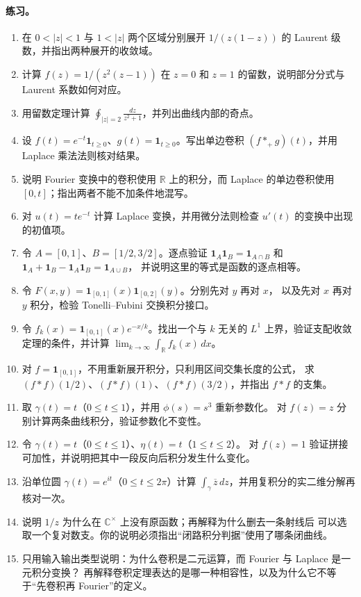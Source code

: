 \documentclass[UTF8,fontset=none,a4paper,11pt]{ctexart}
\theoremstyle{foundation-definition}
\theoremstyle{foundation-theorem}
\theoremstyle{foundation-proposition}
\theoremstyle{foundation-example}
\theoremstyle{foundation-remark}
\theoremstyle{foundation-theorem}
\begin{document}
\paragraph{练习。}
\begin{enumerate}[label=M3C.\arabic*.]
  \item 在 \(0<|z|<1\) 与 \(1<|z|\) 两个区域分别展开
    \(1/(z(1-z))\) 的 Laurent 级数，并指出两种展开的收敛域。
  \item 计算 \(f(z)=1/(z^2(z-1))\) 在 \(z=0\) 和 \(z=1\) 的留数，说明部分分式与 Laurent 系数如何对应。
  \item 用留数定理计算
    \(\displaystyle\oint_{|z|=2}\frac{dz}{z^2+1}\)，并列出曲线内部的奇点。
  \item 设 \(f(t)=e^{-t}\mathbf 1_{t\geq0}\)、\(g(t)=\mathbf 1_{t\geq0}\)。写出单边卷积
    \((f*_+g)(t)\)，并用 Laplace 乘法法则核对结果。
  \item 说明 Fourier 变换中的卷积使用 \(\mathbb R\) 上的积分，而 Laplace 的单边卷积使用 \([0,t]\)；指出两者不能不加条件地混写。
  \item 对 \(u(t)=t e^{-t}\) 计算 Laplace 变换，并用微分法则检查 \(u'(t)\) 的变换中出现的初值项。
  \item 令 \(A=[0,1]\)、\(B=[1/2,3/2]\)。逐点验证
    \(\mathbf 1_A\mathbf 1_B=\mathbf 1_{A\cap B}\) 和
    \(\mathbf 1_A+\mathbf 1_B-\mathbf 1_A\mathbf 1_B=\mathbf 1_{A\cup B}\)，
    并说明这里的等式是函数的逐点相等。
  \item 令
    \(F(x,y)=\mathbf 1_{[0,1]}(x)\mathbf 1_{[0,2]}(y)\)。分别先对 \(y\) 再对 \(x\)，
    以及先对 \(x\) 再对 \(y\) 积分，检验 Tonelli--Fubini 交换积分接口。
  \item 令
    \(f_k(x)=\mathbf 1_{[0,1]}(x)e^{-x/k}\)。找出一个与 \(k\) 无关的
    \(L^1\) 上界，验证支配收敛定理的条件，并计算
    \(\lim_{k\to\infty}\int_{\mathbb R}f_k(x)\,dx\)。
  \item 对 \(f=\mathbf 1_{[0,1]}\)，不用重新展开积分，只利用区间交集长度的公式，
    求 \((f*f)(1/2)\)、\((f*f)(1)\)、\((f*f)(3/2)\)，并指出 \(f*f\) 的支集。
  \item 取 \(\gamma(t)=t\)（\(0\leq t\leq1\)），并用 \(\phi(s)=s^3\) 重新参数化。
    对 \(f(z)=z\) 分别计算两条曲线积分，验证参数化不变性。
  \item 令 \(\gamma(t)=t\)（\(0\leq t\leq1\)）、\(\eta(t)=t\)（\(1\leq t\leq2\)）。
    对 \(f(z)=1\) 验证拼接可加性，并说明把其中一段反向后积分发生什么变化。
  \item 沿单位圆 \(\gamma(t)=e^{it}\)（\(0\leq t\leq2\pi\)）计算
    \(\displaystyle\int_\gamma\overline z\,dz\)，并用复积分的实二维分解再核对一次。
  \item 说明 \(1/z\) 为什么在 \(\mathbb C^\times\) 上没有原函数；再解释为什么删去一条射线后
    可以选取一个复对数支。你的说明必须指出“闭路积分判据”使用了哪条闭曲线。
  \item 只用输入输出类型说明：为什么卷积是二元运算，而 Fourier 与 Laplace 是一元积分变换？
    再解释卷积定理表达的是哪一种相容性，以及为什么它不等于“先卷积再 Fourier”的定义。
\end{enumerate}
\end{document}
